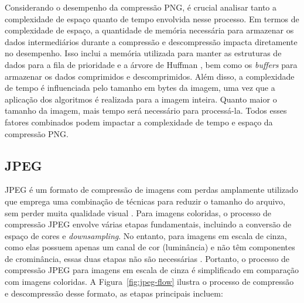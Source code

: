 \begin{figure}[!htbp]
	\centering
\end{figure}

Considerando o desempenho da compressão \acrshort{PNG}, é crucial analisar tanto a complexidade de espaço quanto de tempo envolvida nesse processo. Em termos de complexidade de espaço, a quantidade de memória necessária para armazenar os dados intermediários durante a compressão e descompressão impacta diretamente no desempenho. Isso inclui a memória utilizada para manter as estruturas de dados para a fila de prioridade e a árvore de Huffman \cite{huffmanArticle}, bem como os \textit{buffers} para armazenar os dados comprimidos e descomprimidos. Além disso, a complexidade de tempo é influenciada pelo tamanho em bytes da imagem, uma vez que a aplicação dos algoritmos é realizada para a imagem inteira. Quanto maior o tamanho da imagem, mais tempo será necessário para processá-la. Todos esses fatores combinados podem impactar a complexidade de tempo e espaço da compressão \acrshort{PNG}. \cite{digitalImageProcessingGonzalez}


\subsection{\acrfull{JPEG}}
\acrshort{JPEG} é um formato de compressão de imagens com perdas amplamente utilizado que emprega uma combinação de técnicas para reduzir o tamanho do arquivo, sem perder muita qualidade visual \cite{miano1999compressed}. Para imagens coloridas, o processo de compressão \acrshort{JPEG} envolve várias etapas fundamentais, incluindo a conversão de espaço de cores e \textit{downsampling}. No entanto, para imagens em escala de cinza, como elas possuem apenas um canal de cor (luminância) e não têm componentes de crominância, essas duas etapas não são necessárias \cite{digitalImageProcessingGonzalez}. Portanto, o processo de compressão \acrshort{JPEG} para imagens em escala  de cinza é simplificado em comparação com imagens coloridas. A Figura~\ref{fig:jpeg-flow} ilustra o processo de compressão e descompressão desse formato, as etapas principais incluem:

